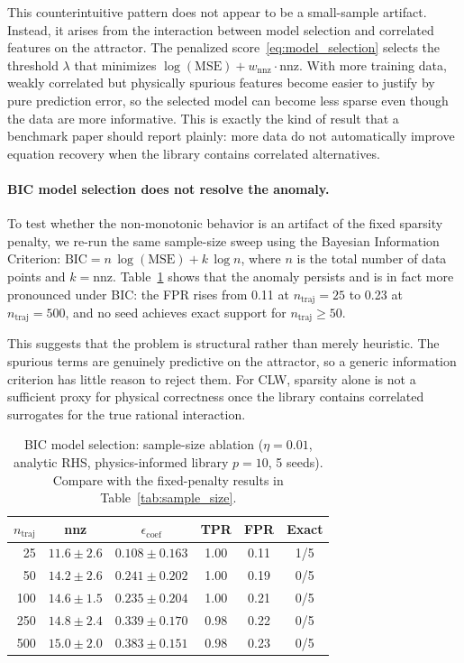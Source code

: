 \documentclass[12pt]{article}
\begin{document}
This counterintuitive pattern does not appear to be a small-sample artifact.
Instead, it arises from the interaction between model selection and correlated features on the attractor.
The penalized score~\eqref{eq:model_selection} selects the threshold $\lambda$ that minimizes $\log(\text{MSE}) + w_\text{nnz}\cdot\text{nnz}$.
With more training data, weakly correlated but physically spurious features become easier to justify by pure prediction error, so the selected model can become less sparse even though the data are more informative.
This is exactly the kind of result that a benchmark paper should report plainly: more data do not automatically improve equation recovery when the library contains correlated alternatives.

\paragraph{BIC model selection does not resolve the anomaly.}
To test whether the non-monotonic behavior is an artifact of the fixed sparsity penalty, we re-run the same sample-size sweep using the Bayesian Information Criterion: $\text{BIC} = n\,\log(\text{MSE}) + k\,\log n$, where $n$ is the total number of data points and $k = \text{nnz}$.
Table~\ref{tab:sample_size_bic} shows that the anomaly persists and is in fact more pronounced under BIC:
the FPR rises from 0.11 at $n_\text{traj}=25$ to 0.23 at $n_\text{traj}=500$, and no seed achieves exact support for $n_\text{traj}\geq 50$.

This suggests that the problem is structural rather than merely heuristic.
The spurious terms are genuinely predictive on the attractor, so a generic information criterion has little reason to reject them.
For CLW, sparsity alone is not a sufficient proxy for physical correctness once the library contains correlated surrogates for the true rational interaction.

\begin{table}[t]
\centering
\caption{BIC model selection: sample-size ablation ($\eta = 0.01$, analytic RHS, physics-informed library $p=10$, 5 seeds). Compare with the fixed-penalty results in Table~\ref{tab:sample_size}.}
\label{tab:sample_size_bic}
\begin{tabular}{rccccc}
\toprule
$n_\text{traj}$ & nnz & $\epsilon_\text{coef}$ & TPR & FPR & Exact \\
\midrule
25  & $11.6 \pm 2.6$ & $0.108 \pm 0.163$ & 1.00 & 0.11 & 1/5 \\
50  & $14.2 \pm 2.6$ & $0.241 \pm 0.202$ & 1.00 & 0.19 & 0/5 \\
100 & $14.6 \pm 1.5$ & $0.235 \pm 0.204$ & 1.00 & 0.21 & 0/5 \\
250 & $14.8 \pm 2.4$ & $0.339 \pm 0.170$ & 0.98 & 0.22 & 0/5 \\
500 & $15.0 \pm 2.0$ & $0.383 \pm 0.151$ & 0.98 & 0.23 & 0/5 \\
\bottomrule
\end{tabular}
\end{table}
\end{document}

